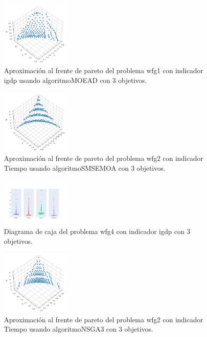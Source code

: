 \documentclass{article}
\begin{document}
\begin{figure}
	\includegraphics[width=0.3\textwidth]{MOEAD_wfg1_igdp_3_fp.png}
	\caption{Aproximación al frente de pareto del problema wfg1 con indicador igdp usando algoritmoMOEAD con 3 objetivos.}
\end{figure}
\clearpage
\begin{figure}
	\includegraphics[width=0.3\textwidth]{SMSEMOA_wfg2_Tiempo_3_fp.png}
	\caption{Aproximación al frente de pareto del problema wfg2 con indicador Tiempo usando algoritmoSMSEMOA con 3 objetivos.}
\end{figure}
\begin{figure}
	\includegraphics[width=0.3\textwidth]{wfg4_igdp_3_bp.png}
	\caption{Diagrama de caja del problema wfg4 con indicador igdp con 3 objetivos.}
\end{figure}
\begin{figure}
	\includegraphics[width=0.3\textwidth]{NSGA3_wfg2_Tiempo_3_fp.png}
	\caption{Aproximación al frente de pareto del problema wfg2 con indicador Tiempo usando algoritmoNSGA3 con 3 objetivos.}
\end{figure}
\end{document}
